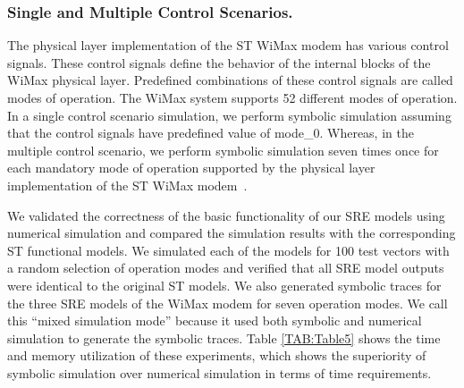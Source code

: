 \documentclass[submission,copyright,creativecommons]{eptcs}
\begin{document}
\subsubsection{Single and Multiple Control Scenarios.}

 The physical layer implementation of the ST WiMax modem has various  control signals. These control signals define the behavior of the internal blocks of the WiMax physical layer. Predefined combinations of these control signals are called modes of operation. The WiMax system supports 52 different modes of operation. In a single control scenario simulation,  we perform symbolic simulation assuming that the control signals have predefined value of mode\_0. Whereas, in the multiple control scenario, we perform symbolic simulation seven times once for each mandatory mode of operation supported by the physical layer implementation of the ST WiMax modem~\cite{39,40}.

We validated the correctness of the basic functionality of our SRE models using numerical simulation and compared the simulation results with the corresponding ST functional models. We simulated each of the models for 100 test vectors with a random selection of operation modes and verified that all SRE model outputs were identical to the original ST models. We also generated symbolic traces for the three SRE models of the WiMax modem for seven operation modes. We call this ``mixed simulation mode'' because it used both symbolic and numerical simulation to generate the symbolic traces. Table \ref{TAB:Table5} shows the time and memory utilization of these experiments, which shows the superiority of symbolic simulation over numerical simulation in terms of time requirements.
\end{document}
